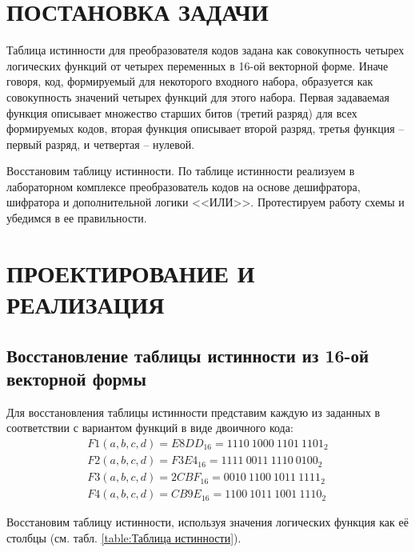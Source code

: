 \documentclass{mirea}
\author     {Краснов Н.O.}
\begin{document}
\chapter{ПОСТАНОВКА ЗАДАЧИ}

Таблица истинности для преобразователя кодов задана как совокупность четырех логических функций от четырех переменных в 16-ой векторной форме. Иначе говоря, код, формируемый для некоторого входного набора, образуется как совокупность значений четырех функций для этого набора. Первая задаваемая функция описывает множество старших битов (третий разряд) для всех формируемых кодов, вторая функция описывает второй разряд, третья функция – первый разряд, и четвертая – нулевой. 

Восстановим таблицу истинности. По таблице истинности реализуем в лабораторном комплексе преобразователь кодов на основе дешифратора, шифратора и дополнительной логики <<ИЛИ>>. Протестируем работу схемы и убедимся в ее правильности.

\chapter{ПРОЕКТИРОВАНИЕ И РЕАЛИЗАЦИЯ}

\section{Восстановление таблицы истинности из 16-ой векторной формы}

Для восстановления таблицы истинности представим каждую из заданных в соответствии с вариантом функций в виде двоичного кода:
\begin{gather*}
	F1(a,b,c,d) = E8DD_{16} = 1110~1000~1101~1101_{2} \\
	F2(a,b,c,d) = F3E4_{16} = 1111~0011~1110~0100_{2} \\
	F3(a,b,c,d) = 2CBF_{16} = 0010~1100~1011~1111_{2} \\
	F4(a,b,c,d) = CB9E_{16} = 1100~1011~1001~1110_{2}
\end{gather*}

Восстановим таблицу истинности, используя значения логических функция как её столбцы (см. табл. \ref{table:Таблица истинности}).
\end{document}
